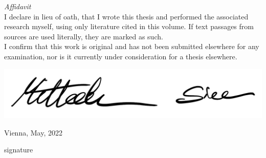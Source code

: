 \vspace*{\fill}

\noindent \textit{Affidavit}\\

\noindent I declare in lieu of oath, that I wrote this thesis and performed the associated research myself, using only literature cited in this volume. If text passages from sources are used literally, they are marked as such.\\
I confirm that this work is original and has not been submitted elsewhere for any examination, nor is it currently under consideration for a thesis elsewhere.

\vspace{15mm}


\includegraphics[width=0.35\linewidth, right, trim=8cm 4cm 0cm 0cm]{files/Signature.png}

\noindent Vienna, May, 2022 \hspace*{5cm} \hrulefill

\hspace*{10cm} signature
